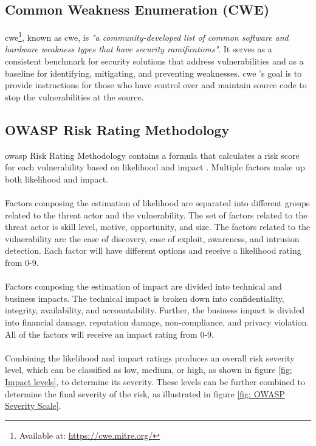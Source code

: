 \subsection{Common Weakness Enumeration (CWE)}
\label{cwe}
\acrlong{cwe}\footnote{Available at:
\url{https://cwe.mitre.org/}}, known as \acrshort{cwe}, is \textit{"a community-developed list of common software and hardware weakness types that have security ramifications"}\cite{CWE}. It serves as a consistent benchmark for security solutions that address vulnerabilities and as a baseline for identifying, mitigating, and preventing weaknesses. \acrshort{cwe} 's goal is to provide instructions for those who have control over and maintain source code to stop the vulnerabilities at the source. 

\subsection{OWASP Risk Rating Methodology}
\acrshort{owasp} Risk Rating Methodology contains a formula that calculates a risk score for each vulnerability based on likelihood and impact \cite{owasprisk}. Multiple factors make up both likelihood and impact. 
\\~\\
Factors composing the estimation of likelihood are separated into different groups related to the threat actor and the vulnerability. The set of factors related to the threat actor is skill level, motive, opportunity, and size. The factors related to the vulnerability are the ease of discovery, ease of exploit, awareness, and intrusion detection. Each factor will have different options and receive a likelihood rating from 0-9. 
\\~\\
Factors composing the estimation of impact are divided into technical and business impacts. The technical impact is broken down into confidentiality, integrity, availability, and accountability. Further, the business impact is divided into financial damage, reputation damage, non-compliance, and privacy violation. All of the factors will receive an impact rating from 0-9. 
\\~\\
Combining the likelihood and impact ratings produces an overall risk severity level, which can be classified as low, medium, or high, as shown in figure \ref{fig: Impact levels}, to determine its severity. These levels can be further combined to determine the final severity of the risk, as illustrated in figure \ref{fig: OWASP Severity Scale}.


